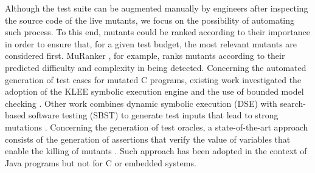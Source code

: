 Although the test suite can be augmented manually by engineers after inspecting the source code of the live mutants, we focus on the possibility of automating such process. To this end, mutants could be ranked according to their importance in order to ensure that, for a given test budget, the most relevant mutants are considered first. MuRanker \cite{namin2015muranker}, for example, ranks mutants according to their predicted difficulty and complexity in being detected. Concerning the automated generation of test cases for mutated C programs, existing work investigated the adoption of the KLEE symbolic execution engine \cite{holling2016nequivack} and the use of bounded model checking \cite{riener2011test}. Other work combines dynamic symbolic execution (DSE) with search-based software testing (SBST) to generate test inputs that lead to strong mutations \cite{harman2011strong}. Concerning the generation of test oracles, a state-of-the-art approach consists of the generation of assertions that verify the value of variables that enable the killing of mutants \cite{fraser2011mutation}. Such approach has been adopted in the context of Java programs but not for C or embedded systems.

